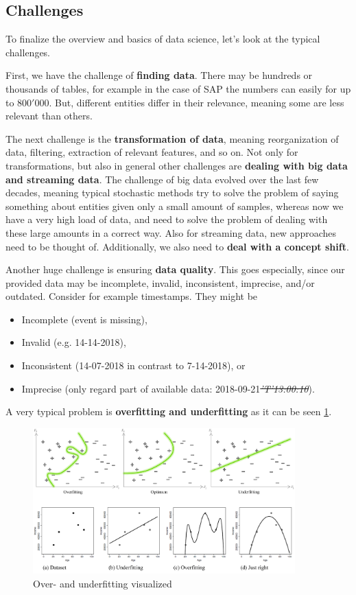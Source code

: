 \subsection{Challenges}
To finalize the overview and basics of data science, let's look at the typical challenges.

First, we have the challenge of \textbf{finding data}. There may be hundreds or thousands of tables, for example in the case of SAP the numbers can easily for up to $800'000$. But, different entities differ in their relevance, meaning some are less relevant than others.

The next challenge is the \textbf{transformation of data}, meaning reorganization of data, filtering, extraction of relevant features, and so on. Not only for transformations, but also in general other challenges are \textbf{dealing with big data and streaming data}. The challenge of big data evolved over the last few decades, meaning typical stochastic methods try to solve the problem of saying something about entities given only a small amount of samples, whereas now we have a very high load of data, and need to solve the problem of dealing with these large amounts in a correct way. Also for streaming data, new approaches need to be thought of. Additionally, we also need to \textbf{deal with a concept shift}.

Another huge challenge is ensuring \textbf{data quality}. This goes especially, since our provided data may be incomplete, invalid, inconsistent, imprecise, and/or outdated. Consider for example timestamps. They might be 
\begin{itemize}
  \item Incomplete {\color{gray}\footnotesize(event is missing)}, 
  \item Invalid {\color{gray}\footnotesize(e.g. 14-14-2018)},
  \item Inconsistent {\color{gray}\footnotesize(14-07-2018 in contrast to 7-14-2018)}, or
  \item Imprecise {\color{gray}\footnotesize(only regard part of available data: 2018-09-21\textit{\st{'T'13:00:10}})}.
\end{itemize}

A very typical problem is \textbf{overfitting and underfitting} as it can be seen \ref{fig:1_over_under_fitting}.

\begin{figure}[H]
  \centering
  \includegraphics[width=0.9\textwidth]{assets/basics/over_under_fitting.png}
  \caption{Over- and underfitting visualized}
  \label{fig:1_over_under_fitting}
\end{figure}

